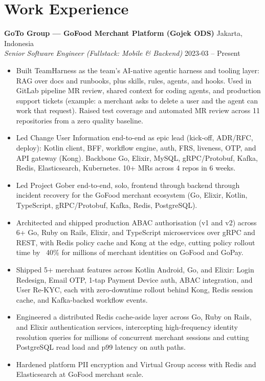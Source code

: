 \documentclass[11pt]{article}
\begin{document}
\section*{Work Experience}
\textbf{GoTo Group — GoFood Merchant Platform (Gojek ODS)} \hfill Jakarta, Indonesia\\
\textit{Senior Software Engineer (Fullstack: Mobile \& Backend)} \hfill 2023-03 -- Present\\
\begin{itemize}
\item Built TeamHarness as the team's AI-native agentic harness and tooling layer: RAG over docs and runbooks, plus skills, rules, agents, and hooks. Used in GitLab pipeline MR review, shared context for coding agents, and production support tickets (example: a merchant asks to delete a user and the agent can work that request). Raised test coverage and automated MR review across 11 repositories from a zero quality baseline.
\item Led Change User Information end-to-end as epic lead (kick-off, ADR/RFC, deploy): Kotlin client, BFF, workflow engine, auth, FRS, liveness, OTP, and API gateway (Kong). Backbone Go, Elixir, MySQL, gRPC/Protobuf, Kafka, Redis, Elasticsearch, Kubernetes. 10+ MRs across 4 repos in 6 weeks.
\item Led Project Gober end-to-end, solo, frontend through backend through incident recovery for the GoFood merchant ecosystem (Go, Elixir, Kotlin, TypeScript, gRPC/Protobuf, Kafka, Redis, PostgreSQL).
\item Architected and shipped production ABAC authorisation (v1 and v2) across 6+ Go, Ruby on Rails, Elixir, and TypeScript microservices over gRPC and REST, with Redis policy cache and Kong at the edge, cutting policy rollout time by ~40\% for millions of merchant identities on GoFood and GoPay.
\item Shipped 5+ merchant features across Kotlin Android, Go, and Elixir: Login Redesign, Email OTP, 1-tap Payment Device auth, ABAC integration, and User Re-KYC, each with zero-downtime rollout behind Kong, Redis session cache, and Kafka-backed workflow events.
\item Engineered a distributed Redis cache-aside layer across Go, Ruby on Rails, and Elixir authentication services, intercepting high-frequency identity resolution queries for millions of concurrent merchant sessions and cutting PostgreSQL read load and p99 latency on auth paths.
\item Hardened platform PII encryption and Virtual Group access with Redis and Elasticsearch at GoFood merchant scale.
\end{itemize}
\end{document}
